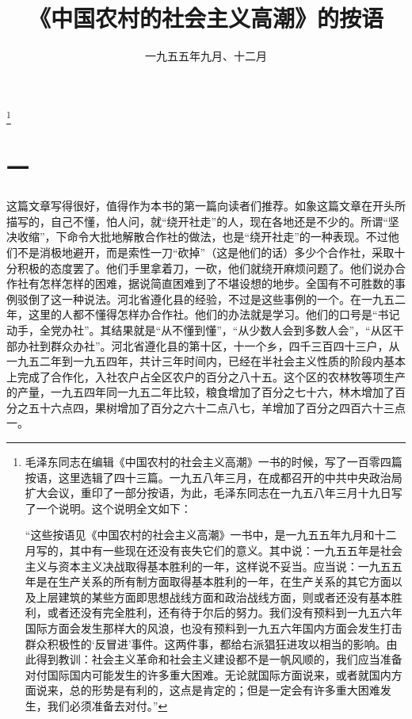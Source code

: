 
\title{《中国农村的社会主义高潮》的按语}
\date{一九五五年九月、十二月}
\thanks{毛泽东同志在编辑《中国农村的社会主义高潮》一书的时候，写了一百零四篇按语，这里选辑了四十三篇。一九五八年三月，在成都召开的中共中央政治局扩大会议，重印了一部分按语，为此，毛泽东同志在一九五八年三月十九日写了一个说明。这个说明全文如下：\par
“这些按语见《中国农村的社会主义高潮》一书中，是一九五五年九月和十二月写的，其中有一些现在还没有丧失它们的意义。其中说：一九五五年是社会主义与资本主义决战取得基本胜利的一年，这样说不妥当。应当说：一九五五年是在生产关系的所有制方面取得基本胜利的一年，在生产关系的其它方面以及上层建筑的某些方面即思想战线方面和政治战线方面，则或者还没有基本胜利，或者还没有完全胜利，还有待于尔后的努力。我们没有预料到一九五六年国际方面会发生那样大的风浪，也没有预料到一九五六年国内方面会发生打击群众积极性的‘反冒进’事件。这两件事，都给右派猖狂进攻以相当的影响。由此得到教训：社会主义革命和社会主义建设都不是一帆风顺的，我们应当准备对付国际国内可能发生的许多重大困难。无论就国际方面说来，或者就国内方面说来，总的形势是有利的，这点是肯定的；但是一定会有许多重大困难发生，我们必须准备去对付。”}
\maketitle


\section*{一}

这篇文章写得很好，值得作为本书的第一篇向读者们推荐。如象这篇文章在开头所描写的，自己不懂，怕人问，就“绕开社走”的人，现在各地还是不少的。所谓“坚决收缩”，下命令大批地解散合作社的做法，也是“绕开社走”的一种表现。不过他们不是消极地避开，而是索性一刀“砍掉”（这是他们的话）多少个合作社，采取十分积极的态度罢了。他们手里拿着刀，一砍，他们就绕开麻烦问题了。他们说办合作社有怎样怎样的困难，据说简直困难到了不堪设想的地步。全国有不可胜数的事例驳倒了这一种说法。河北省遵化县的经验，不过是这些事例的一个。在一九五二年，这里的人都不懂得怎样办合作社。他们的办法就是学习。他们的口号是“书记动手，全党办社”。其结果就是“从不懂到懂”，“从少数人会到多数人会”，“从区干部办社到群众办社”。河北省遵化县的第十区，十一个乡，四千三百四十三户，从一九五二年到一九五四年，共计三年时间内，已经在半社会主义性质的阶段内基本上完成了合作化，入社农户占全区农户的百分之八十五。这个区的农林牧等项生产的产量，一九五四年同一九五二年比较，粮食增加了百分之七十六，林木增加了百分之五十六点四，果树增加了百分之六十二点八七，羊增加了百分之四百六十三点一。


